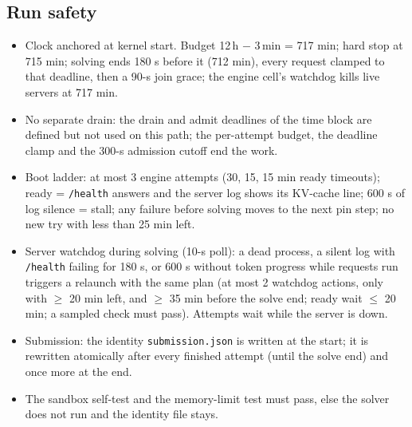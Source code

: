 \subsection{Run safety}
\begin{itemize}[leftmargin=*,itemsep=1pt]
\item Clock anchored at kernel start. Budget 12\,h $-$ 3\,min = 717 min; hard stop at 715 min; solving ends 180 s before it (712 min), every request clamped to that deadline, then a 90-s join grace; the engine cell's watchdog kills live servers at 717 min.
\item No separate drain: the drain and admit deadlines of the time block are defined but not used on this path; the per-attempt budget, the deadline clamp and the 300-s admission cutoff end the work.
\item Boot ladder: at most 3 engine attempts (30, 15, 15 min ready timeouts); ready = \texttt{/health} answers and the server log shows its KV-cache line; 600 s of log silence = stall; any failure before solving moves to the next pin step; no new try with less than 25 min left.
\item Server watchdog during solving (10-s poll): a dead process, a silent log with \texttt{/health} failing for 180 s, or 600 s without token progress while requests run triggers a relaunch with the same plan (at most 2 watchdog actions, only with $\ge$ 20 min left, and $\ge$ 35 min before the solve end; ready wait $\le$ 20 min; a sampled check must pass). Attempts wait while the server is down.
\item Submission: the identity \texttt{submission.json} is written at the start; it is rewritten atomically after every finished attempt (until the solve end) and once more at the end.
\item The sandbox self-test and the memory-limit test must pass, else the solver does not run and the identity file stays.
\end{itemize}


